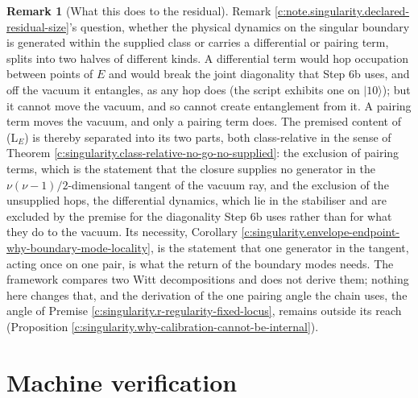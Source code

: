 \documentclass[11pt]{article}
\theoremstyle{definition}
\newtheorem{remark}[theorem]{Remark}
\theoremstyle{plain}
\begin{document}
\begin{remark}[What this does to the residual]\label{c:note.singularity.what-does-residual}
Remark \ref{c:note.singularity.declared-residual-size}'s question, whether the physical dynamics on the singular boundary is generated within the supplied class or carries a differential or pairing term, splits into two halves of different kinds. A differential term would hop occupation between points of $E$ and would break the joint diagonality that Step 6b uses, and off the vacuum it entangles, as any hop does (the script exhibits one on $|10\rangle$); but it cannot move the vacuum, and so cannot create entanglement from it. A pairing term moves the vacuum, and only a pairing term does. The premised content of (L$_E$) is thereby separated into its two parts, both class-relative in the sense of Theorem \ref{c:singularity.class-relative-no-go-no-supplied}: the exclusion of pairing terms, which is the statement that the closure supplies no generator in the $\nu(\nu - 1)/2$-dimensional tangent of the vacuum ray, and the exclusion of the unsupplied hops, the differential dynamics, which lie in the stabiliser and are excluded by the premise for the diagonality Step 6b uses rather than for what they do to the vacuum. Its necessity, Corollary \ref{c:singularity.envelope-endpoint-why-boundary-mode-locality}, is the statement that one generator in the tangent, acting once on one pair, is what the return of the boundary modes needs. The framework compares two Witt decompositions and does not derive them; nothing here changes that, and the derivation of the one pairing angle the chain uses, the angle of Premise \ref{c:singularity.r-regularity-fixed-locus}, remains outside its reach (Proposition \ref{c:singularity.why-calibration-cannot-be-internal}).
\end{remark}

\section{Machine verification}
\end{document}
